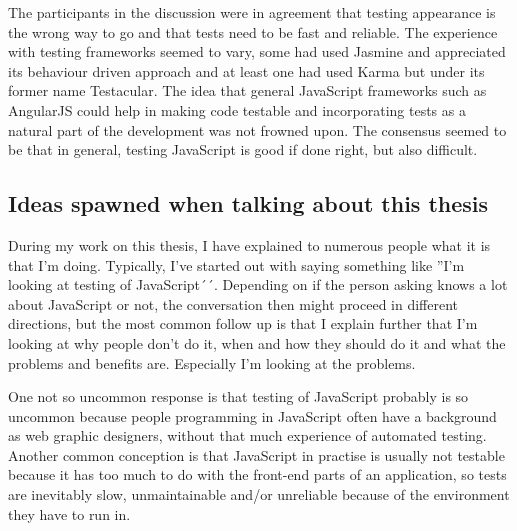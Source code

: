 \documentclass[11pt]{article}
\begin{document}
The participants in the discussion were in agreement that testing appearance is the wrong way to go and that tests need to be fast and reliable. The experience with testing frameworks seemed to vary, some had used Jasmine and appreciated its behaviour driven approach and at least one had used Karma but under its former name Testacular. The idea that general JavaScript frameworks such as AngularJS could help in making code testable and incorporating tests as a natural part of the development was not frowned upon. The consensus seemed to be that in general, testing JavaScript is good if done right, but also difficult.

\subsection{Ideas spawned when talking about this thesis}

During my work on this thesis, I have explained to numerous people what it is that I'm doing. Typically, I've started out with saying something like ''I'm looking at testing of JavaScript´´. Depending on if the person asking knows a lot about JavaScript or not, the conversation then might proceed in different directions, but the most common follow up is that I explain further that I'm looking at why people don't do it, when and how they should do it and what the problems and benefits are. Especially I'm looking at the problems.

One not so uncommon response is that testing of JavaScript probably is so uncommon because people programming in JavaScript often have a background as web graphic designers, without that much experience of automated testing. Another common conception is that JavaScript in practise is usually not testable because it has too much to do with the front-end parts of an application, so tests are inevitably slow, unmaintainable and/or unreliable because of the environment they have to run in.

\printbibliography
\end{document}
